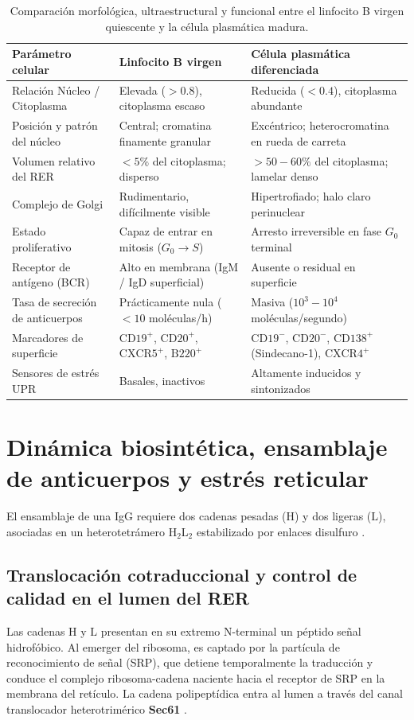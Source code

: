 \begin{table}[t]
\centering
\caption{Comparación morfológica, ultraestructural y funcional entre el linfocito B virgen quiescente y la célula plasmática madura.}
\label{tab:comparacion_b_plasma}
\small
\begin{tabularx}{\textwidth}{p{4.2cm}YY}
\toprule
\textbf{Parámetro celular} & \textbf{Linfocito B virgen} & \textbf{Célula plasmática diferenciada} \\
\midrule
Relación Núcleo / Citoplasma & Elevada ($>0.8$), citoplasma escaso & Reducida ($<0.4$), citoplasma abundante \\
Posición y patrón del núcleo & Central; cromatina finamente granular & Excéntrico; heterocromatina en rueda de carreta \\
Volumen relativo del RER & $< 5\%$ del citoplasma; disperso & $> 50-60\%$ del citoplasma; lamelar denso \\
Complejo de Golgi & Rudimentario, difícilmente visible & Hipertrofiado; halo claro perinuclear \\
Estado proliferativo & Capaz de entrar en mitosis ($G_0 \to S$) & Arresto irreversible en fase $G_0$ terminal \\
Receptor de antígeno (BCR) & Alto en membrana (IgM / IgD superficial) & Ausente o residual en superficie \\
Tasa de secreción de anticuerpos & Prácticamente nula ($< 10$ moléculas/h) & Masiva ($10^3 - 10^4$ moléculas/segundo) \\
Marcadores de superficie & $\text{CD19}^+$, $\text{CD20}^+$, $\text{CXCR5}^+$, $\text{B220}^+$ & $\text{CD19}^-$, $\text{CD20}^-$, $\text{CD138}^+$ (Sindecano-1), $\text{CXCR4}^+$ \\
Sensores de estrés UPR & Basales, inactivos & Altamente inducidos y sintonizados \\
\bottomrule
\end{tabularx}
\end{table}

\section{Dinámica biosintética, ensamblaje de anticuerpos y estrés reticular}


El ensamblaje de una IgG requiere dos cadenas pesadas ($\text{H}$) y dos ligeras ($\text{L}$), asociadas en un heterotetrámero $\text{H}_2\text{L}_2$ estabilizado por enlaces disulfuro \parencite{walter2011unfolded}.


\subsection{Translocación cotraduccional y control de calidad en el lumen del RER}
Las cadenas $\text{H}$ y $\text{L}$ presentan en su extremo N-terminal un péptido señal hidrofóbico. Al emerger del ribosoma, es captado por la partícula de reconocimiento de señal (SRP), que detiene temporalmente la traducción y conduce el complejo ribosoma-cadena naciente hacia el receptor de SRP en la membrana del retículo. La cadena polipeptídica entra al lumen a través del canal translocador heterotrimérico \textbf{Sec61} \parencite{alberts2022molecular,karp2020cell}.

